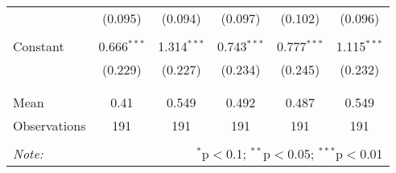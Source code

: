 \begin{tabular}{@{\extracolsep{5pt}}lccccc}
  & (0.095) & (0.094) & (0.097) & (0.102) & (0.096) \\ 
  & & & & & \\ 
 Constant & 0.666$^{***}$ & 1.314$^{***}$ & 0.743$^{***}$ & 0.777$^{***}$ & 1.115$^{***}$ \\ 
  & (0.229) & (0.227) & (0.234) & (0.245) & (0.232) \\ 
  & & & & & \\ 
\hline \\[-1.8ex] 
Mean & 0.41 & 0.549 & 0.492 & 0.487 & 0.549 \\ 
Observations & 191 & 191 & 191 & 191 & 191 \\ 
\hline 
\hline \\[-1.8ex] 
\textit{Note:}  & \multicolumn{5}{r}{$^{*}$p$<$0.1; $^{**}$p$<$0.05; $^{***}$p$<$0.01} \\ 
\end{tabular} 
